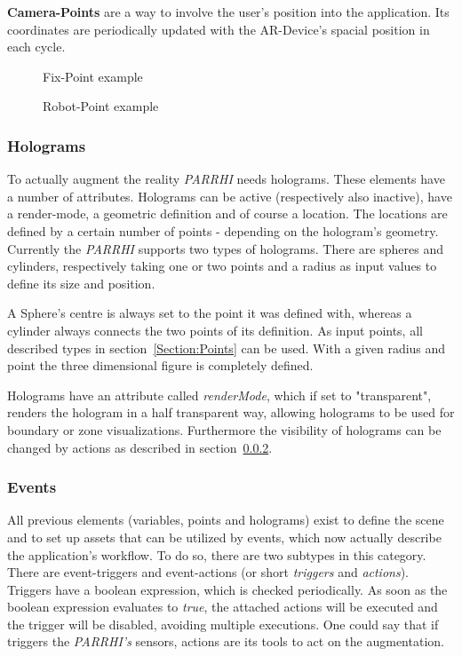 \textbf{Camera-Points} are a way to involve the user's position into the application. Its coordinates are periodically updated with the AR-Device's spacial position in each cycle.


\begin{figure}
	\begin{minipage}{0.45\textwidth}
		\centering
		
		\caption{Fix-Point example}
		\label{InputData:PointFix}
	\end{minipage}\hfill
	\begin{minipage}{0.45\textwidth}
		\centering
		
		\caption{Robot-Point example}
		\label{InputData:PointRobot}
	\end{minipage}
\end{figure}


\subsubsection{Holograms}\label{Section:Holograms}
To actually augment the reality \textit{PARRHI} needs holograms. These elements have a number of attributes. Holograms can be active (respectively also inactive), have a render-mode, a geometric definition and of course a location. The locations are defined by a certain number of points - depending on the hologram's geometry. Currently the \textit{PARRHI} supports two types of holograms. There are spheres and cylinders, respectively taking one or two points and a radius as input values to define its size and position.

A Sphere's centre is always set to the point it was defined with, whereas a cylinder always connects the two points of its definition. As input points, all described types in section~\ref{Section:Points} can be used. With a given radius and point the three dimensional figure is completely defined.

Holograms have an attribute called \textit{renderMode}, which if set to "transparent", renders the hologram in a half transparent way, allowing holograms to be used for boundary or zone visualizations. Furthermore the visibility of holograms can be changed by actions as described in section~\ref{Section:Events}.

\subsubsection{Events}\label{Section:Events}
All previous elements (variables, points and holograms) exist to define the scene and to set up assets that can be utilized by events, which now actually describe the application's workflow. To do so, there are two subtypes in this category. There are event-triggers and event-actions (or short \textit{triggers} and \textit{actions}). Triggers have a boolean expression, which is checked periodically. As soon as the boolean expression evaluates to \textit{true}, the attached actions will be executed and the trigger will be disabled, avoiding multiple executions. One could say that if triggers the \textit{PARRHI's} sensors, actions are its tools to act on the augmentation. 

